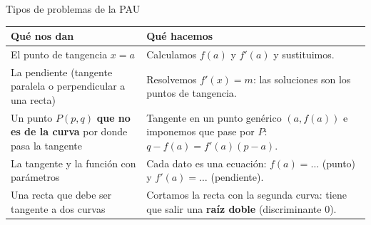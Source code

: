 \documentclass[11pt,a4paper]{article}
\begin{document}
\begin{fmdef}{Tipos de problemas de la PAU}
\begin{center}\renewcommand{\arraystretch}{1.5}\small\begin{tabularx}{\linewidth}{>{\raggedright\arraybackslash}p{5.5cm}>{\raggedright\arraybackslash}X}\toprule
\textbf{Qué nos dan} & \textbf{Qué hacemos}\\\midrule
El punto de tangencia $x=a$ & Calculamos $f(a)$ y $f'(a)$ y sustituimos.\\[3pt]
La pendiente (tangente paralela o perpendicular a una recta) & Resolvemos $f'(x)=m$: las soluciones son los puntos de tangencia.\\[3pt]
Un punto $P(p,q)$ \textbf{que no es de la curva} por donde pasa la tangente & Tangente en un punto genérico $(a,f(a))$ e imponemos que pase por $P$: $q-f(a)=f'(a)(p-a)$.\\[3pt]
La tangente y la función con parámetros & Cada dato es una ecuación: $f(a)=\dots$ (punto) y $f'(a)=\dots$ (pendiente).\\[3pt]
Una recta que debe ser tangente a dos curvas & Cortamos la recta con la segunda curva: tiene que salir una \textbf{raíz doble} (discriminante 0).\\[3pt]
\bottomrule\end{tabularx}\end{center}
\end{fmdef}
\end{document}

